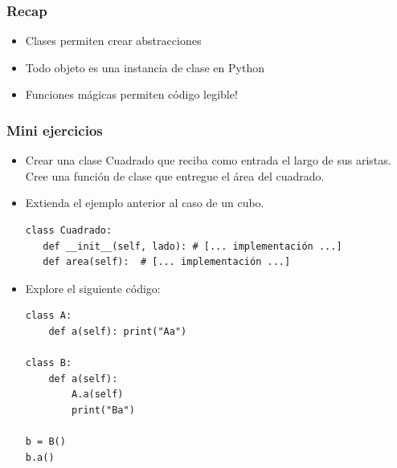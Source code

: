 \documentclass[14pt,aspectratio=169,xcolor=dvipsnames]{beamer}
\begin{document}
\begin{frame}\frametitle{Recap}
    \begin{itemize}
        \item Clases permiten crear abstracciones
        \item Todo objeto es una instancia de clase en Python
        \item Funciones mágicas permiten código legible!
    \end{itemize}
\end{frame}
\begin{frame}
    \maketitle
\end{frame}
\begin{frame}\frametitle{Mini ejercicios}
    \begin{footnotesize}
    \begin{itemize}
        \item Crear una clase Cuadrado que reciba como entrada el largo de sus aristas. Cree una función de clase que entregue el área del cuadrado.
        \item Extienda el ejemplo anterior al caso de un cubo.
    \begin{verbatim}
class Cuadrado:
   def __init__(self, lado): # [... implementación ...]
   def area(self):  # [... implementación ...]
    \end{verbatim}
        \item Explore el siguiente código:
    \begin{verbatim}
class A:
    def a(self): print("Aa")

class B:
    def a(self):
        A.a(self)
        print("Ba")

b = B()
b.a()
        \end{verbatim}
    \end{itemize}
    \end{footnotesize}
\end{frame}
\end{document}
